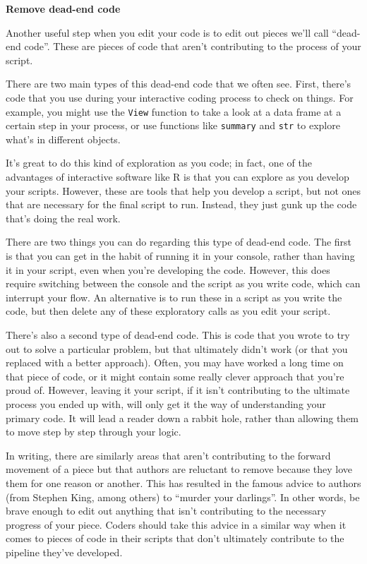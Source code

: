 \documentclass[]{tufte-book}
\begin{document}
\textbf{Remove dead-end code}

Another useful step when you edit your code is to edit out pieces we'll call
``dead-end code''. These are pieces of code that aren't contributing to the
process of your script.

There are two main types of this dead-end code that we often see. First, there's
code that you use during your interactive coding process to check on things. For
example, you might use the \texttt{View} function to take a look at a data frame at a
certain step in your process, or use functions like \texttt{summary} and \texttt{str} to
explore what's in different objects.

It's great to do this kind of exploration as you code; in fact, one of the
advantages of interactive software like R is that you can explore as you
develop your scripts. However, these are tools that help you develop a script,
but not ones that are necessary for the final script to run. Instead, they just
gunk up the code that's doing the real work.

There are two things you can do regarding this type of dead-end code. The first
is that you can get in the habit of running it in your console, rather than
having it in your script, even when you're developing the code. However, this
does require switching between the console and the script as you write code,
which can interrupt your flow. An alternative is to run these in a script as
you write the code, but then delete any of these exploratory calls as you
edit your script.

There's also a second type of dead-end code. This is code that you wrote to try
out to solve a particular problem, but that ultimately didn't work (or that
you replaced with a better approach). Often, you may have worked a long time
on that piece of code, or it might contain some really clever approach that
you're proud of. However, leaving it your script, if it isn't contributing to
the ultimate process you ended up with, will only get it the way of understanding
your primary code. It will lead a reader down a rabbit hole, rather than allowing
them to move step by step through your logic.

In writing, there are similarly areas that aren't contributing to the forward
movement of a piece but that authors are reluctant to remove because they love
them for one reason or another. This has resulted in the famous advice to
authors (from Stephen King, among others) to ``murder your darlings''. In other
words, be brave enough to edit out anything that isn't contributing to the
necessary progress of your piece. Coders should take this advice in a similar
way when it comes to pieces of code in their scripts that don't ultimately
contribute to the pipeline they've developed.
\end{document}
